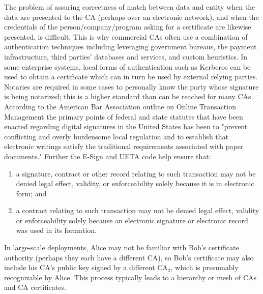 The problem of assuring correctness of match between data and entity when the data are presented to the CA (perhaps over an electronic network), and when the credentials of the person/company/program asking for a certificate are likewise presented, is difficult. This is why commercial CAs often use a combination of authentication techniques including leveraging government bureaus, the payment infrastructure, third parties' databases and services, and custom heuristics. In some enterprise systems, local forms of authentication such as Kerberos can be used to obtain a certificate which can in turn be used by external relying parties. Notaries are required in some cases to personally know the party whose signature is being notarized; this is a higher standard than can be reached for many CAs. According to the American Bar Association outline on Online Transaction Management the primary points of federal and state statutes that have been enacted regarding digital signatures in the United States has been to "prevent conflicting and overly burdensome local regulation and to establish that electronic writings satisfy the traditional requirements associated with paper documents." Further the E-Sign and UETA code help ensure that:
\begin{enumerate}
\item a signature, contract or other record relating to such transaction may not be denied legal effect, validity, or enforceability solely because it is in electronic form; and
\item a contract relating to such transaction may not be denied legal effect, validity or enforceability solely because an electronic signature or electronic record was used in its formation.
\end{enumerate}
In large-scale deployments, Alice may not be familiar with Bob's certificate authority (perhaps they each have a different CA), so Bob's certificate may also include his CA's public key signed by a different CA$_{2}$, which is presumably recognizable by Alice. This process typically leads to a hierarchy or mesh of CAs and CA certificates.

